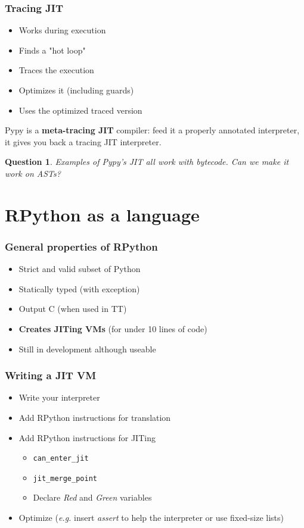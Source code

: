 \documentclass{beamer}
\newtheorem{question}{Question}
\begin{document}
\frame
{
  \frametitle{Tracing JIT}
  	
	\begin{itemize}
		\item<1-> Works during execution
		\item<2-> Finds a "hot loop"
		\item<3-> Traces the execution
		\item<4-> Optimizes it (including guards)
		\item<5-> Uses the optimized traced version
	\end{itemize}
{
	\begin{fact}
	Pypy is a \textbf{meta-tracing JIT} compiler: feed it a properly annotated interpreter, it gives you back a tracing JIT	 interpreter.
	\end{fact}
}
}

\frame
{
	\begin{question}
	Examples of Pypy's JIT all work with bytecode. Can we make it work on ASTs?
	\end{question}
}		


\section{RPython as a language}
\frame
{
  \frametitle{General properties of RPython}
  
  \begin{itemize}
  	\item<1-> Strict and valid subset of Python
	\item<2-> Statically typed (with exception)
	\item<3-> Output C (when used in TT)
	\item<4-> \textbf{Creates JITing VMs} (for under 10 lines of code)
	\item<5-> Still in development although useable
  \end{itemize}
}

\frame
{
  \frametitle{Writing a JIT VM}
  
  \begin{itemize}
  	\item<1-> Write your interpreter
	\item<2-> Add RPython instructions for translation
	\item<3-> Add RPython instructions for JITing
		\begin{itemize}
			\item<4-> \texttt{can\_enter\_jit}
			\item<5-> \texttt{jit\_merge\_point}
			\item<6-> Declare \textit{Red} and \textit{Green} variables
		\end{itemize}
	\item<7-> Optimize (\textit{e.g.} insert \textit{assert} to help the interpreter or  use fixed-size lists)
  \end{itemize}
}
\end{document}
